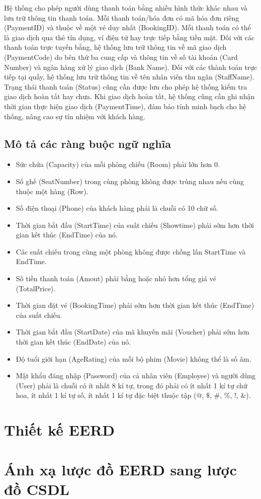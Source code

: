 \documentclass[a4paper]{article}
\begin{document}
Hệ thống cho phép người dùng thanh toán bằng nhiều hình thức khác nhau và lưu trữ thông tin thanh toán. 
Mỗi thanh toán/hóa đơn có mã hóa đơn riêng (PaymentID) và thuộc về một vé duy nhất (BookingID). 
Mỗi thanh toán có thể là giao dịch qua thẻ tín dụng, ví điện tử hay trực tiếp bằng tiền mặt. 
Đối với các thanh toán trực tuyến bằng, hệ thống lưu trữ thông tin về mã giao dịch (PaymentCode) do bên thứ ba cung cấp và thông tin về số tài khoản (Card Number) và ngân hàng xử lý giao dịch (Bank Name). 
Đối với các thành toán trực tiếp tại quầy, hệ thống lưu trữ thông tin về tên nhân viên thu ngân (StaffName). 
Trạng thái thanh toán (Status) cũng cần được lưu cho phép hệ thống kiểm tra giao dịch hoàn tất hay chưa. 
Khi giao dịch hoàn tất, hệ thống cũng cần ghi nhận thời gian thực hiện giao dịch (PaymentTime), đảm bảo tính minh bạch cho hệ thống, nâng cao sự tín nhiệm với khách hàng.


\subsection{Mô tả các ràng buộc ngữ nghĩa}
\begin{itemize}
	\item Sức chứa (Capacity) của mỗi phòng chiếu (Room) phải lớn hơn 0.
	\item Số ghế (SeatNumber) trong cùng phòng không được trùng nhau nếu cùng thuộc một hàng (Row).
	\item Số điện thoại (Phone) của khách hàng phải là chuỗi có 10 chữ số.
	\item Thời gian bắt đầu (StartTime) của suất chiếu (Showtime) phải sớm hơn thời gian kết thúc (EndTime) của nó.
	\item Các suất chiếu trong cùng một phòng không được chồng lấn StartTime và EndTime.
	\item Số tiền thanh toán (Amout) phải bằng hoặc nhỏ hơn tổng giá vé (TotalPrice).
	\item Thời gian đặt vé (BookingTime) phải sớm hơn thời gian kết thúc (EndTime) của suất chiếu.
	\item Thời gian bắt đầu (StartDate) của mã khuyến mãi (Voucher) phải sớm hơn thời gian kết thúc (EndDate) của nó.
	\item Độ tuổi giới hạn (AgeRating) của mỗi bộ phim (Movie) không thể là số âm.
	\item Mật khẩu đăng nhập (Password) của cả nhân viên (Employee) và người dùng (User) phải là chuỗi có ít nhất 8 kí tự, trong đó phải có ít nhất 1 kí tự chữ hoa, ít nhất 1 kí tự số, ít nhất 1 kí tự đặc biệt thuộc tập ($@$, $\mathdollar$, $\#$, $\%$, !, $\&$).
\end{itemize}
\section{Thiết kế EERD}
\section{Ánh xạ lược đồ EERD sang lược đồ CSDL}
\end{document}
